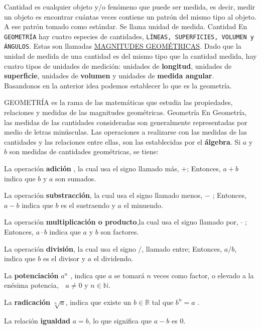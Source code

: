 \begin{ideas}{ Cantidad es cualquier objeto y/o fenómeno que puede ser medida, es decir,
medir un objeto es encontrar cuántas veces contiene un patrón del mismo tipo al objeto.
A ese patrón tomado como estándar. Se llama  unidad de medida.
}{Cantidad}
En \texttt{GEOMETRÍA} hay cuatro especies de cantidades, \texttt{LÍNEAS,
SUPERFICIES, VOLUMEN y
ÁNGULOS}. Estas son llamadas \underline{MAGNITUDES GEOMÉTRICAS}.
Dado que la unidad de medida de una cantidad es del mismo tipo que la cantidad
medida, hay cuatro tipos de unidades de medición: unidades de \textbf{longitud}, unidades
de \textbf{superficie}, unidades de \textbf{volumen} y unidades de \textbf{medida angular}. \\
Basandonos en la anterior idea podemos establecer lo que es la geometría.
\begin{ideas}{GEOMETRÍA es la rama de las matemáticas que estudia las propiedades, relaciones y
medidas de las magnitudes geométricas.
}{Geometría}
En Geometría, las medidas de las cantidades consideradas son generalmente representadas por
medio de letras minúsculas. Las operaciones a realizarse con las medidas de las cantidades
y las relaciones entre ellas, son las establecidas por el \textbf{álgebra}.
Si $a$ y $b$ son medidas de  cantidades geométricas, se tiene:
\begin{lista}
 \item La operación \textbf{adición} , la cual usa el signo llamado más, $+$;
 Entonces, $a + b$ indica que $b$ y $a$ son sumados.
\item La operación \textbf{substracción}, la cual usa el signo llamado menos, $-$ ;
Entonces, $a-b$ indica que $b$ es el sustraendo y $a$ el minuendo.
\item La operación \textbf{multiplicación o producto},la cual usa el signo llamado por, $\cdot$ ;
Entonces, $a \cdot b$ indica que $a$ y $b$ son factores.
\item La operación \textbf{división}, la cual usa el signo $/$, llamado entre;
Entonces, $a/b$, indica que $b$ es el divisor y $a$ el dividendo.
\item La \textbf{potenciación} $a^n$ , indica que $a$ se tomará $n$ veces como factor,
 o elevado a la enésima potencia,\, \nota \, $a\neq 0$ y $n \in \mathbb{N}$.
\item La \textbf{radicación} $\sqrt[n]{a}$, indica que existe
 un $b \in \mathbb{R}$ tal que  $b^n=a$ .
\item La relación \textbf{igualdad} $a=b$,
lo que significa que $a-b$ es $0$.

\end{lista}
\end{ideas}
\end{ideas}
